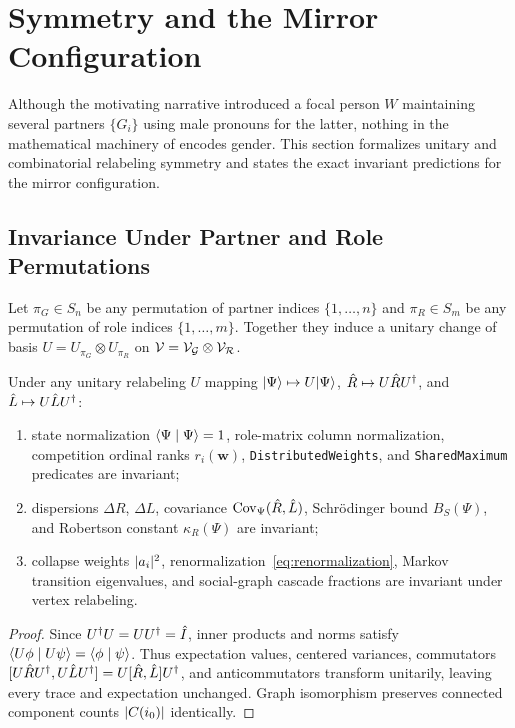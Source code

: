\section{Symmetry and the Mirror Configuration}
\label{sec:symmetry}

Although the motivating narrative introduced a focal person $W$ maintaining several
partners $\{G_i\}$ using male pronouns for the latter, nothing in the mathematical
machinery of \RST{} encodes gender. This section formalizes unitary and combinatorial
relabeling symmetry and states the exact invariant predictions for the mirror configuration.

\subsection{Invariance Under Partner and Role Permutations}
\label{subsec:sym-invariance}

\noindent\layermath{} Let $\pi_G \in S_n$ be any permutation of partner indices $\{1, \dots, n\}$
and $\pi_R \in S_m$ be any permutation of role indices $\{1, \dots, m\}$. Together they
induce a unitary change of basis $U = U_{\pi_G} \otimes U_{\pi_R}$ on
$\mathcal{V} = \mathcal{V}_{\mathcal{G}} \otimes \mathcal{V}_{\mathcal{R}}$.

\begin{proposition}
\label{prop:unitary-invariance}
Under any unitary relabeling $U$ mapping $\lvert \Psi \rangle \mapsto U\lvert \Psi \rangle$,
$\hat{R} \mapsto U\hat{R} U^\dagger$, and $\hat{L} \mapsto U\hat{L} U^\dagger$:
\begin{enumerate}[nosep]
  \item state normalization $\langle \Psi \mid \Psi \rangle = 1$, role-matrix column normalization,
        competition ordinal ranks $r_i(\mathbf{w})$, \textnormal{\texttt{DistributedWeights}},
        and \textnormal{\texttt{SharedMaximum}} predicates are invariant;
  \item dispersions $\Delta R$, $\Delta L$, covariance $\mathrm{Cov}_\Psi(\hat{R},\hat{L})$,
        Schr\"odinger bound $B_S(\Psi)$, and Robertson constant $\kappa_R(\Psi)$ are invariant;
  \item collapse weights $\lvert a_i \rvert^2$, renormalization~\eqref{eq:renormalization},
        Markov transition eigenvalues, and social-graph cascade fractions are invariant
        under vertex relabeling.
\end{enumerate}
\end{proposition}
\begin{proof}
Since $U^\dagger U = U U^\dagger = \hat{I}$, inner products and norms satisfy
$\langle U\phi \mid U\psi \rangle = \langle \phi \mid \psi \rangle$. Thus expectation values, centered variances,
commutators $[U\hat{R} U^\dagger, U\hat{L} U^\dagger] = U[\hat{R}, \hat{L}]U^\dagger$, and
anticommutators transform unitarily, leaving every trace and expectation unchanged.
Graph isomorphism preserves connected component counts $\lvert C(i_0) \rvert$ identically.
\end{proof}

